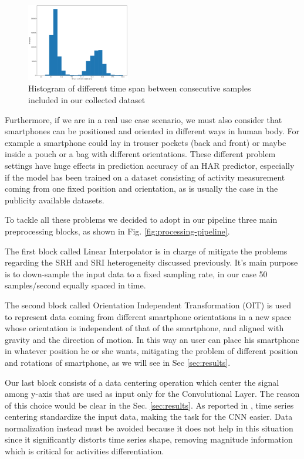 \begin{figure}[h]
	\centering
	\includegraphics[width=0.4\textwidth]{images/interval_samples.png}
	\caption{Histogram of different time span between consecutive samples included in our collected dataset}
	\label{time-span}
\end{figure}

Furthermore, if we are in a real use case scenario, we must also consider that smartphones can be positioned and oriented in different ways in human body. For example a smartphone could lay in trouser pockets (back and front) or maybe inside a pouch or a bag with different orientations. These different problem settings have huge effects in prediction accuracy of an HAR predictor, especially if the model has been trained on a dataset consisting of activity measurement coming from one fixed position and orientation, as is usually the case in the publicity available datasets.

To tackle all these problems we decided to adopt in our pipeline three main preprocessing blocks, as shown in Fig. \ref{fig:processing-pipeline}.

The first block called Linear Interpolator is in charge of mitigate the problems regarding the SRH and SRI heterogeneity discussed previously. It's main purpose is to down-sample the input data to a fixed sampling rate, in our case 50 samples/second equally spaced in time.

The second block called Orientation Independent Transformation (OIT) is used to represent data coming from different smartphone orientations in a new space whose orientation is independent of that of the smartphone, and aligned with gravity and the direction of motion. In this way an user can place his smartphone in whatever position he or she wants, mitigating the problem of different position and rotations of smartphone, as we will see in Sec \ref{sec:results}.

Our last block consists of a data centering operation which center the signal among y-axis that are used as input only for the Convolutional Layer. The reason of this choice would be clear in the Sec. \ref{sec:results}. As reported in \cite{ignatov2018real}, time series centering standardize the input data, making the task for the CNN easier. Data normalization instead must be avoided because it does not help in this situation since it significantly distorts time series shape, removing magnitude information which is critical for activities differentiation.

